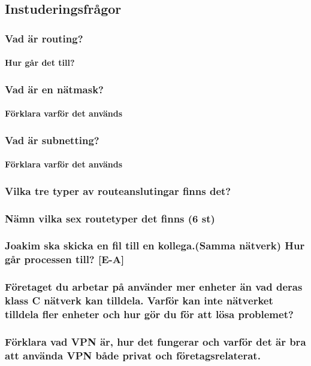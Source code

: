 \subsection{Instuderingsfrågor}

\subsubsection{Vad är routing?}
\paragraph{Hur går det till?}
\subsubsection{Vad är en nätmask?}
\paragraph{Förklara varför det används}
\subsubsection{Vad är subnetting?}
\paragraph{Förklara varför det används}
\subsubsection{Vilka tre typer av routeanslutingar finns det?}
\subsubsection{Nämn vilka sex routetyper det finns (6 st)}
\subsubsection{Joakim ska skicka en fil till en kollega.(Samma nätverk) Hur går processen till? [E-A]}
\subsubsection{Företaget du arbetar på använder mer enheter än vad deras klass C nätverk kan tilldela. Varför kan inte nätverket tilldela fler enheter och hur gör du för att lösa problemet?}
\subsubsection{Förklara vad VPN är, hur det fungerar och varför det är bra att använda VPN både privat och företagsrelaterat.}